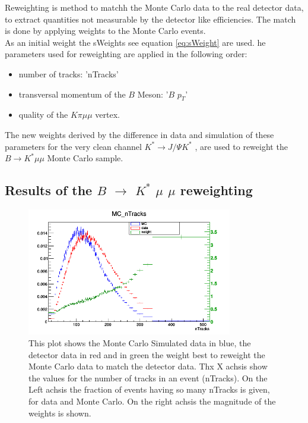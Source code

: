 \documentclass[english]{uzhpub}
\begin{document}
Reweighting is method to matchh the Monte Carlo data to the real detector data, to extract quantities not measurable by the detector like efficiencies. The match is done by applying weights to the Monte Carlo events. \\
As an initial weight the sWeights see equation \ref{eq:sWeight} are used. he parameters used for reweighting are applied in the following order:
\begin{itemize}
  \item number of tracks: 'nTracks'
  \item transversal momentum of the $B$ Meson: '$B$ $p_T$'
  \item quality of the $K \pi \mu \mu$ vertex.
\end{itemize}
The new weights derived by the difference in data and simulation of these parameters for the very clean channel $K^* \rightarrow J/ \Psi K^{*}$ \cite{bib:JPsi}, are used to reweight the $B \rightarrow K^* \mu \mu$ Monte Carlo sample.

\subsection{Results of the $B$ $\rightarrow$ $K^{*}$ $\mu$ $\mu$ reweighting}

\begin{figure}[H]
\centering
\includegraphics[width=0.8\textwidth]{Reweighting/nTracksw}
\caption{This plot shows the Monte Carlo Simulated data in blue, the detector data in red and in green the weight best to reweight the Monte Carlo data to match the detector data. Thx X achsis show the values for the number of tracks in an event (nTracks). On the Left achsis the fraction of events having so many nTracks is given, for data and Monte Carlo. On the right achsis the magnitude of the weights is shown.}
\label{fig:nTracksw}
\end{figure}
\end{document}
